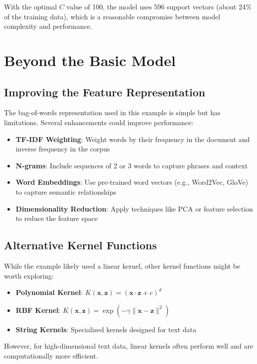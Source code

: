 \documentclass{article}
\begin{document}
With the optimal $C$ value of 100, the model uses 596 support vectors (about 24\% of the training data), which is a reasonable compromise between model complexity and performance.

\section{Beyond the Basic Model}

\subsection{Improving the Feature Representation}
The bag-of-words representation used in this example is simple but has limitations. Several enhancements could improve performance:

\begin{itemize}
    \item \textbf{TF-IDF Weighting}: Weight words by their frequency in the document and inverse frequency in the corpus
    \item \textbf{N-grams}: Include sequences of 2 or 3 words to capture phrases and context
    \item \textbf{Word Embeddings}: Use pre-trained word vectors (e.g., Word2Vec, GloVe) to capture semantic relationships
    \item \textbf{Dimensionality Reduction}: Apply techniques like PCA or feature selection to reduce the feature space
\end{itemize}

\subsection{Alternative Kernel Functions}
While the example likely used a linear kernel, other kernel functions might be worth exploring:

\begin{itemize}
    \item \textbf{Polynomial Kernel}: $K(\mathbf{x}, \mathbf{z}) = (\mathbf{x} \cdot \mathbf{z} + c)^d$
    \item \textbf{RBF Kernel}: $K(\mathbf{x}, \mathbf{z}) = \exp(-\gamma \|\mathbf{x} - \mathbf{z}\|^2)$
    \item \textbf{String Kernels}: Specialized kernels designed for text data
\end{itemize}

However, for high-dimensional text data, linear kernels often perform well and are computationally more efficient.
\end{document}
